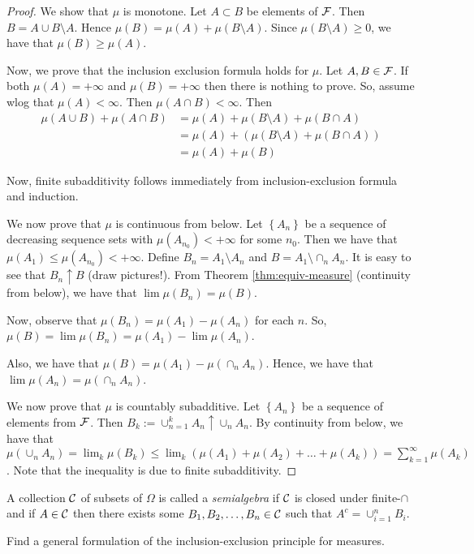 \begin{proof}
    We show that $\mu$ is monotone. Let $A \subset B$ be elements of ${\cal F}$. Then $B=A\cup B\setminus A$. Hence $\mu (B) = \mu (A) + \mu (B\setminus A)$. Since $\mu (B\setminus A ) \ge 0$, we have that $\mu (B) \ge \mu (A)$. 

    Now, we prove that the inclusion exclusion formula holds for $\mu$. Let $A, B\in {\cal F}$. If both $\mu(A) = +\infty$ and $\mu (B) = + \infty$ then there is nothing to prove. So, assume wlog that $\mu (A) < \infty$. Then $\mu (A \cap B) < \infty$.  Then
    \begin{align*}
	\mu (A \cup B) + \mu (A\cap B) &= \mu (A) + \mu (B \setminus A) + \mu (B\cap A)  \\
	&= \mu (A) + (\mu (B \setminus A) + \mu (B\cap A))  \\
	&= \mu (A) + \mu (B)
    \end{align*}

    Now, finite subadditivity follows immediately from inclusion-exclusion formula and induction.

    We now prove that $\mu$ is continuous from below. Let $\left\{ A_n \right\}$ be a sequence of decreasing sequence sets with $\mu (A_{n_0}) < +\infty$ for some $n_0$. Then we have that $\mu (A_1) \le \mu (A_{n_0}) < +\infty$. Define $B_n = A_1 \setminus A_n$ and $B=A_1 \setminus \cap_n A_n$. It is easy to see that $B_n \uparrow B$ (draw pictures!). From Theorem \ref{thm:equiv-measure} (continuity from below), we have that $\lim \mu (B_n ) = \mu (B)$.   

    Now, observe that $\mu (B_n ) = \mu (A_1) - \mu (A_n )$ for each $n$. So, $\mu (B) = \lim \mu (B_n) = \mu (A_1) - \lim \mu (A_n)$. 

    Also, we have that $\mu (B) = \mu (A_1) - \mu (\cap_n A_n )$. Hence, we have that $\lim \mu (A_n ) = \mu \left( \cap_n A_n \right)$. 

    We now prove that $\mu$ is countably subadditive. Let $\left\{ A_n \right\}$ be a sequence of elements from ${\cal F}$. Then $B_k := \cup_{n=1}^{k} A_n \uparrow \cup_{n} A_n$. By continuity from below, we have that $\mu \left( \cup_n A_n \right) = \lim_k \mu (B_k) \le \lim_k \left( \mu (A_1) + \mu (A_2) + \ldots + \mu (A_k) \right)= \sum_{k=1}^{\infty} \mu (A_k)$. Note that the inequality is due to finite subadditivity.
\end{proof}

\begin{definition}
    A collection ${\cal C}$ of subsets of $\Omega$ is called a \textit{semialgebra} if ${\cal C}$ is closed under finite-$\cap$ and if $A\in {\cal C}$ then there exists some $B_1, B_2 , \ldots , B_n \in {\cal C}$ such that $A^c = \cup_{i=1}^{n} B_i$.
    \label{def:semialgebra}
\end{definition}

\begin{exercise}
    Find a general formulation of the inclusion-exclusion principle for measures.
\end{exercise}

